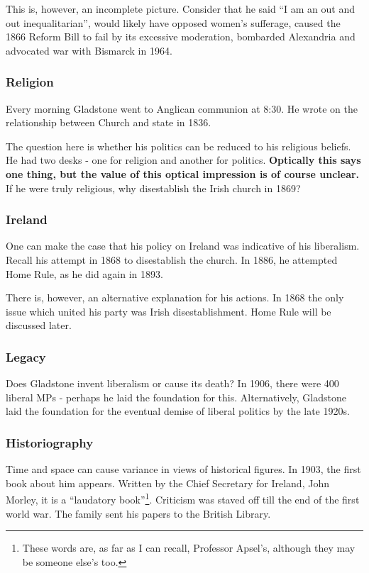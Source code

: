 		This is, however, an incomplete picture. Consider that he said ``I am an out and out inequalitarian'', would likely have opposed women's sufferage, caused the 1866 Reform Bill to fail by its excessive moderation, bombarded Alexandria and advocated war with Bismarck in 1964.

		\subsubsection{Religion}

		Every morning Gladstone went to Anglican communion at 8:30. He wrote on the relationship between Church and state in 1836.

		The question here is whether his politics can be reduced to his religious beliefs. He had two desks - one for religion and another for politics. \textbf{Optically this says one thing, but the value of this optical impression is of course unclear.} If he were truly religious, why disestablish the Irish church in 1869?

		\subsubsection{Ireland}

		One can make the case that his policy on Ireland was indicative of his liberalism. Recall his attempt in 1868 to disestablish the church. In 1886, he attempted Home Rule, as he did again in 1893.

		There is, however, an alternative explanation for his actions. In 1868 the only issue which united his party was Irish disestablishment. Home Rule will be discussed later.

		\subsubsection{Legacy}

		Does Gladstone invent liberalism or cause its death? In 1906, there were 400 liberal MPs - perhaps he laid the foundation for this. Alternatively, Gladstone laid the foundation for the eventual demise of liberal politics by the late 1920s.

		\subsubsection{Historiography}

		Time and space can cause variance in views of historical figures. In 1903, the first book about him appears. Written by the Chief Secretary for Ireland, John Morley, it is a ``laudatory book''\footnote{These words are, as far as I can recall, Professor Apsel's, although they may be someone else's too.}. Criticism was staved off till the end of the first world war. The family sent his papers to the British Library.

